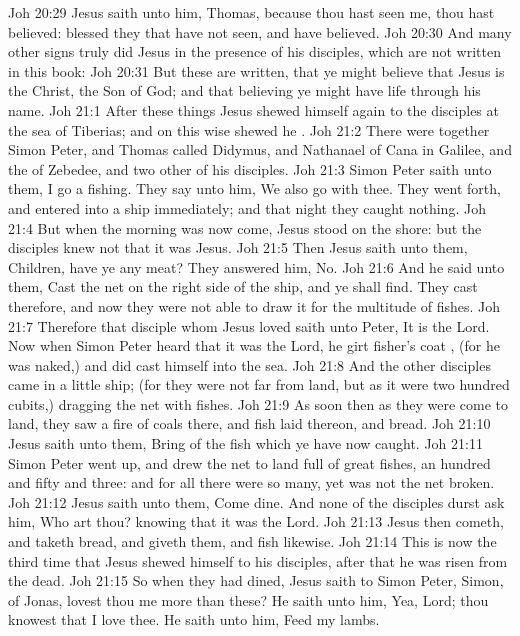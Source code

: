 \vs Joh 20:29 Jesus saith unto him, Thomas, because thou hast seen me, thou hast believed: blessed  they that have not seen, and  have believed.
\vs Joh 20:30 And many other signs truly did Jesus in the presence of his disciples, which are not written in this book:
\vs Joh 20:31 But these are written, that ye might believe that Jesus is the Christ, the Son of God; and that believing ye might have life through his name.
\vs Joh 21:1 After these things Jesus shewed himself again to the disciples at the sea of Tiberias; and on this wise shewed he .
\vs Joh 21:2 There were together Simon Peter, and Thomas called Didymus, and Nathanael of Cana in Galilee, and the  of Zebedee, and two other of his disciples.
\vs Joh 21:3 Simon Peter saith unto them, I go a fishing. They say unto him, We also go with thee. They went forth, and entered into a ship immediately; and that night they caught nothing.
\vs Joh 21:4 But when the morning was now come, Jesus stood on the shore: but the disciples knew not that it was Jesus.
\vs Joh 21:5 Then Jesus saith unto them, Children, have ye any meat? They answered him, No.
\vs Joh 21:6 And he said unto them, Cast the net on the right side of the ship, and ye shall find. They cast therefore, and now they were not able to draw it for the multitude of fishes.
\vs Joh 21:7 Therefore that disciple whom Jesus loved saith unto Peter, It is the Lord. Now when Simon Peter heard that it was the Lord, he girt  fisher's coat , (for he was naked,) and did cast himself into the sea.
\vs Joh 21:8 And the other disciples came in a little ship; (for they were not far from land, but as it were two hundred cubits,) dragging the net with fishes.
\vs Joh 21:9 As soon then as they were come to land, they saw a fire of coals there, and fish laid thereon, and bread.
\vs Joh 21:10 Jesus saith unto them, Bring of the fish which ye have now caught.
\vs Joh 21:11 Simon Peter went up, and drew the net to land full of great fishes, an hundred and fifty and three: and for all there were so many, yet was not the net broken.
\vs Joh 21:12 Jesus saith unto them, Come  dine. And none of the disciples durst ask him, Who art thou? knowing that it was the Lord.
\vs Joh 21:13 Jesus then cometh, and taketh bread, and giveth them, and fish likewise.
\vs Joh 21:14 This is now the third time that Jesus shewed himself to his disciples, after that he was risen from the dead.
\vs Joh 21:15 So when they had dined, Jesus saith to Simon Peter, Simon,  of Jonas, lovest thou me more than these? He saith unto him, Yea, Lord; thou knowest that I love thee. He saith unto him, Feed my lambs.
